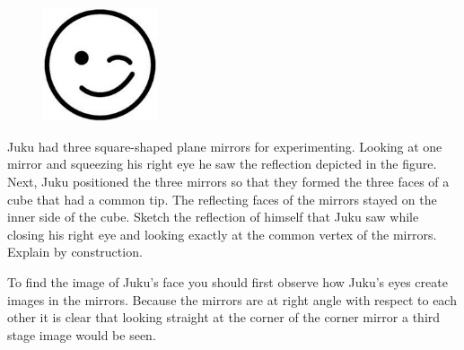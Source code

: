 {\ifEngStatement
\begin{figure}
	\vspace{-25pt}
	\begin{center}
		\includegraphics[width=0.3\textwidth]{2016-v3g-08-wink}
	\end{center}
	\vspace{-20pt}
\end{figure}
Juku had three square-shaped plane mirrors for experimenting. Looking at one mirror and squeezing his right eye he saw the reflection depicted in the figure. Next, Juku positioned the three mirrors so that they formed the three faces of a cube that had a common tip. The reflecting faces of the mirrors stayed on the inner side of the cube. Sketch the reflection of himself that Juku saw while closing his right eye and looking exactly at the common vertex of the mirrors. Explain by construction.
\fi


\ifEngHint
To find the image of Juku’s face you should first observe how Juku’s eyes create images in the mirrors. Because the mirrors are at right angle with respect to each other it is clear that looking straight at the corner of the corner mirror a third stage image would be seen.
\fi


}
